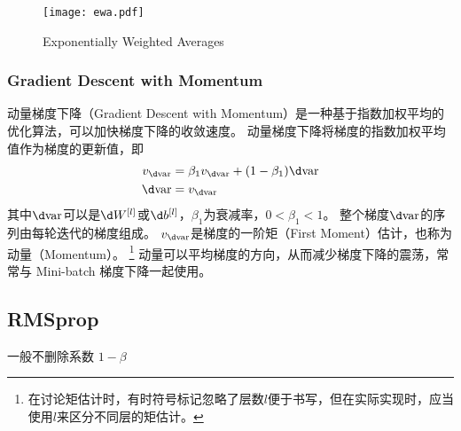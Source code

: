 \begin{figure}[h!bt]
    \centering
    \texttt{[image: ewa.pdf]}
    \caption{Exponentially Weighted Averages}
    \label{fig:ewa}
\end{figure}

\subsubsection{Gradient Descent with Momentum}

动量梯度下降（Gradient Descent with Momentum）是一种基于指数加权平均的优化算法，可以加快梯度下降的收敛速度。
动量梯度下降将梯度的指数加权平均值作为梯度的更新值，即
\begin{equation}
    \begin{aligned}
        v_{\d \mathrm{var}} &= \beta_1 v_{\d \mathrm{var}} + (1 - \beta_1)\d \mathrm{var} \\
        \d \mathrm{var} &= v_{\d \mathrm{var}}
    \end{aligned}
\end{equation}
其中$\d \mathrm{var}$可以是$\d W^{[l]}$或$\d b^{[l]}$，$\beta_1$为衰减率，$0 < \beta_1 < 1$。
整个梯度$\d \mathrm{var}$的序列由每轮迭代的梯度组成。
$v_{\d \mathrm{var}}$是梯度的一阶矩（First Moment）估计，也称为动量（Momentum）。
\footnote{在讨论矩估计时，有时符号标记忽略了层数$l$便于书写，但在实际实现时，应当使用$l$来区分不同层的矩估计。}
动量可以平均梯度的方向，从而减少梯度下降的震荡，常常与 Mini-batch 梯度下降一起使用。

\subsection{RMSprop}

一般不删除系数 $1 - \beta$ 
